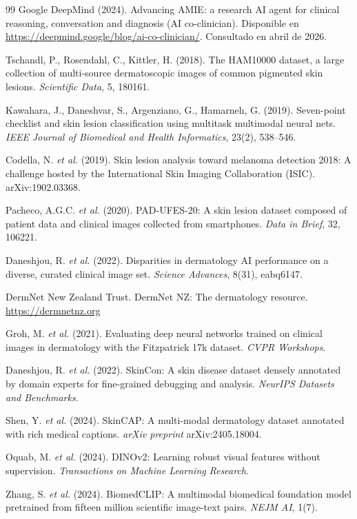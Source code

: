 \begin{thebibliography}{99}
Google DeepMind (2024). Advancing AMIE: a research AI agent for clinical reasoning, conversation and diagnosis (AI co-clinician). Disponible en \url{https://deepmind.google/blog/ai-co-clinician/}. Consultado en abril de 2026.

Tschandl, P., Rosendahl, C., Kittler, H. (2018). The HAM10000 dataset, a large collection of multi-source dermatoscopic images of common pigmented skin lesions. \emph{Scientific Data}, 5, 180161.

Kawahara, J., Daneshvar, S., Argenziano, G., Hamarneh, G. (2019). Seven-point checklist and skin lesion classification using multitask multimodal neural nets. \emph{IEEE Journal of Biomedical and Health Informatics}, 23(2), 538--546.

Codella, N. \emph{et al.} (2019). Skin lesion analysis toward melanoma detection 2018: A challenge hosted by the International Skin Imaging Collaboration (ISIC). arXiv:1902.03368.

Pacheco, A.G.C. \emph{et al.} (2020). PAD-UFES-20: A skin lesion dataset composed of patient data and clinical images collected from smartphones. \emph{Data in Brief}, 32, 106221.

Daneshjou, R. \emph{et al.} (2022). Disparities in dermatology AI performance on a diverse, curated clinical image set. \emph{Science Advances}, 8(31), eabq6147.

DermNet New Zealand Trust. DermNet NZ: The dermatology resource. \url{https://dermnetnz.org}

Groh, M. \emph{et al.} (2021). Evaluating deep neural networks trained on clinical images in dermatology with the Fitzpatrick 17k dataset. \emph{CVPR Workshops}.

Daneshjou, R. \emph{et al.} (2022). SkinCon: A skin disease dataset densely annotated by domain experts for fine-grained debugging and analysis. \emph{NeurIPS Datasets and Benchmarks}.

Shen, Y. \emph{et al.} (2024). SkinCAP: A multi-modal dermatology dataset annotated with rich medical captions. \emph{arXiv preprint} arXiv:2405.18004.

Oquab, M. \emph{et al.} (2024). DINOv2: Learning robust visual features without supervision. \emph{Transactions on Machine Learning Research}.

Zhang, S. \emph{et al.} (2024). BiomedCLIP: A multimodal biomedical foundation model pretrained from fifteen million scientific image-text pairs. \emph{NEJM AI}, 1(7).


\end{thebibliography}
